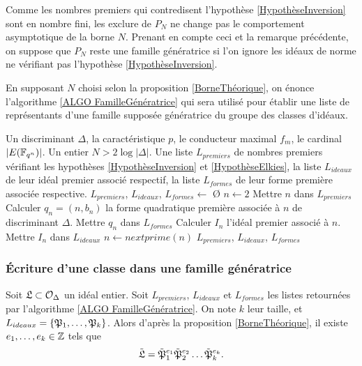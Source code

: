 \begin{Rem}
	Comme les nombres premiers qui contredisent l'hypothèse \ref{HypothèseInversion} sont en nombre fini, les exclure de $P_{N}$ ne change pas le comportement asymptotique de la borne $N$. Prenant en compte ceci et la remarque précédente, on suppose que $P_{N}$ reste une famille génératrice si l'on ignore les idéaux de norme ne vérifiant pas l'hypothèse \ref{HypothèseInversion}. 
\end{Rem} 

En supposant $N$ choisi selon la proposition \ref{BorneThéorique}, on énonce  l'algorithme \ref{ALGO FamilleGénératrice} qui sera utilisé pour établir une liste de représentants d'une famille supposée génératrice du groupe des classes d'idéaux. 

\begin{algorithm}[H]
	\caption{Famille génératrice du groupe de classes}\label{ALGO FamilleGénératrice}
	\begin{algorithmic}[1]
		\Require Un discriminant $\Delta$, la caractéristique $p$, le conducteur maximal $f_{m}$, le cardinal $|E(\mathbb{F}_{q^{n}})|$. Un entier $N > 2\log|\Delta|$.
		\Ensure Une liste $L_{premiers}$ de nombres premiers vérifiant les hypothèses \ref{HypothèseInversion} et \ref{HypothèseElkies}, la liste $L_{ideaux}$ de leur idéal premier associé respectif, la liste $L_{formes}$ de leur forme première associée respective. 
		\State $L_{premiers}$, $L_{ideaux}$, $L_{formes} \gets$ \O
		\State $n \gets 2$
		\State Mettre $n$ dans $L_{premiers}$
		\State Calculer $q_{n} = (n ,b_{n})$ la forme quadratique première associée à $n$ de discriminant $\Delta$.
		\State Mettre $q_{n}$ dans $L_{formes}$
		\State Calculer $I_{n}$ l'idéal premier associé à $n$. 
		\State Mettre $I_{n}$ dans $L_{ideaux}$
		\EndIf
		\State $n \gets nextprime(n)$
		\EndWhile
		\State\Return $L_{premiers}$, $L_{ideaux}$, $L_{formes}$
	\end{algorithmic}
\end{algorithm}







\subsubsection{Écriture d'une classe dans une famille génératrice}


Soit $\mathfrak{L}\subset\mathcal{O}_{\Delta}$ un idéal entier. Soit $L_{premiers}$, $L_{ideaux}$ et $L_{formes}$ les listes retournées par l'algorithme \ref{ALGO FamilleGénératrice}. On note $k$ leur taille, et $L_{ideaux} = \left\lbrace \mathfrak{P}_{1},\ldots,\mathfrak{P}_{k}\right\rbrace$. Alors d'après la proposition \ref{BorneThéorique}, il existe $e_{1},\ldots,e_{k}\in\mathbb{Z}$ tels que
\begin{equation*}
	\tilde{\mathfrak{L}} = \tilde{\mathfrak{P}}_{1}^{e_{1}}\tilde{\mathfrak{P}}_{2}^{e_{2}}\ldots\tilde{\mathfrak{P}}_{k}^{e_{k}}.
\end{equation*}

